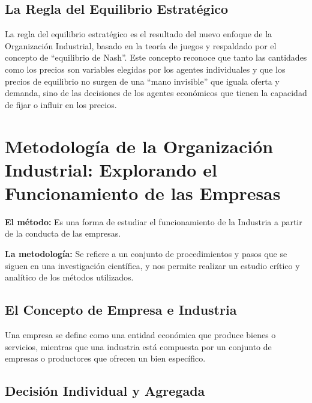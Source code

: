 \documentclass[
  letterpaper,
  DIV=11,
  numbers=noendperiod]{scrartcl}
\begin{document}
\hypertarget{la-regla-del-equilibrio-estratuxe9gico}{%
\subsection{La Regla del Equilibrio
Estratégico}\label{la-regla-del-equilibrio-estratuxe9gico}}

La regla del equilibrio estratégico es el resultado del nuevo enfoque de
la Organización Industrial, basado en la teoría de juegos y respaldado
por el concepto de ``equilibrio de Nash''. Este concepto reconoce que
tanto las cantidades como los precios son variables elegidas por los
agentes individuales y que los precios de equilibrio no surgen de una
``mano invisible'' que iguala oferta y demanda, sino de las decisiones
de los agentes económicos que tienen la capacidad de fijar o influir en
los precios.

\hypertarget{metodologuxeda-de-la-organizaciuxf3n-industrial-explorando-el-funcionamiento-de-las-empresas}{%
\section{Metodología de la Organización Industrial: Explorando el
Funcionamiento de las
Empresas}\label{metodologuxeda-de-la-organizaciuxf3n-industrial-explorando-el-funcionamiento-de-las-empresas}}

\textbf{El método:} Es una forma de estudiar el funcionamiento de la
Industria a partir de la conducta de las empresas.

\textbf{La metodología:} Se refiere a un conjunto de procedimientos y
pasos que se siguen en una investigación científica, y nos permite
realizar un estudio crítico y analítico de los métodos utilizados.

\hypertarget{el-concepto-de-empresa-e-industria}{%
\subsection{El Concepto de Empresa e
Industria}\label{el-concepto-de-empresa-e-industria}}

Una empresa se define como una entidad económica que produce bienes o
servicios, mientras que una industria está compuesta por un conjunto de
empresas o productores que ofrecen un bien específico.

\hypertarget{decisiuxf3n-individual-y-agregada}{%
\subsection{Decisión Individual y
Agregada}\label{decisiuxf3n-individual-y-agregada}}
\end{document}
